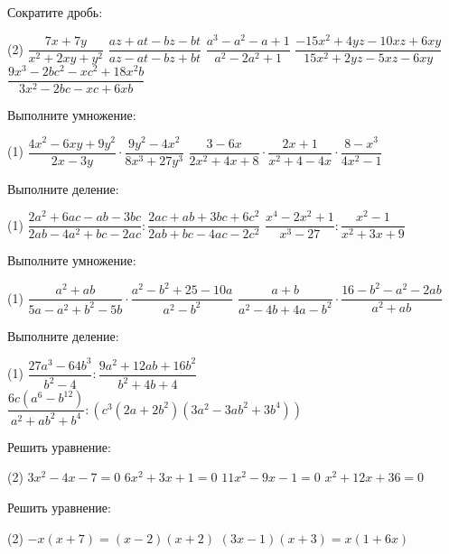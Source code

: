 %

\begin{class}[number=1]
	\begin{listofex}
		\item Сократите дробь:
		\begin{tasks}(2)
			\task \( \dfrac{7x+7y}{x^2+2xy+y^2} \)
			\task \( \dfrac{az+at-bz-bt}{az-at-bz+bt} \)
			\task \( \dfrac{a^3-a^2-a+1}{a^2-2a^2+1} \)
			\task \( \dfrac{-15x^2+4yz-10xz+6xy}{15x^2+2yz-5xz-6xy} \)
			\task \( \dfrac{9x^3-2bc^2-xc^2+18x^2b}{3x^2-2bc-xc+6xb} \)
		\end{tasks}
		\item Выполните умножение:
		\begin{tasks}(1)
			\task \( \dfrac{4x^2-6xy+9y^2}{2x-3y}\cdot\dfrac{9y^2-4x^2}{8x^3+27y^3} \)
			\task \( \dfrac{3-6x}{2x^2+4x+8}\cdot\dfrac{2x+1}{x^2+4-4x}\cdot\dfrac{8-x^3}{4x^2-1} \)
		\end{tasks}
		\item Выполните деление:
		\begin{tasks}(1)
				\task \( \dfrac{2a^2+6ac-ab-3bc}{2ab-4a^2+bc-2ac}:\dfrac{2ac+ab+3bc+6c^2}{2ab+bc-4ac-2c^2} \)
				\task \( \dfrac{x^4-2x^2+1}{x^3-27}:\dfrac{x^2-1}{x^2+3x+9} \)
		\end{tasks}
	\end{listofex}
\end{class}

\begin{homework}[number=1]
	\begin{listofex}
		\item Выполните умножение:
		\begin{tasks}(1)
			\task \( \dfrac{a^2+ab}{5a-a^2+b^2-5b}\cdot\dfrac{a^2-b^2+25-10a}{a^2-b^2} \)
			\task \( \dfrac{a+b}{a^2-4b+4a-b^2}\cdot\dfrac{16-b^2-a^2-2ab}{a^2+ab} \)
		\end{tasks}
		\item Выполните деление:
		\begin{tasks}(1)
			\task \( \dfrac{27a^3-64b^3}{b^2-4}:\dfrac{9a^2+12ab+16b^2}{b^2+4b+4} \)
			\task \( \dfrac{6c(a^6-b^{12})}{a^2+ab^2+b^4}:(c^3(2a+2b^2)(3a^2-3ab^2+3b^4)) \)
		\end{tasks}
		\item Решить уравнение:
		\begin{tasks}(2)
			\task \( 3x^2-4x-7=0 \)
			\task \( 6x^2+3x+1=0 \)
			\task \( 11x^2-9x-1=0 \)
			\task \( x^2+12x+36=0 \)
		\end{tasks}
		\item Решить уравнение:
		\begin{tasks}(2)
			\task \( -x(x+7)=(x-2)(x+2) \)
			\task \( (3x-1)(x+3)=x(1+6x) \)
		\end{tasks}
	\end{listofex}
\end{homework}

